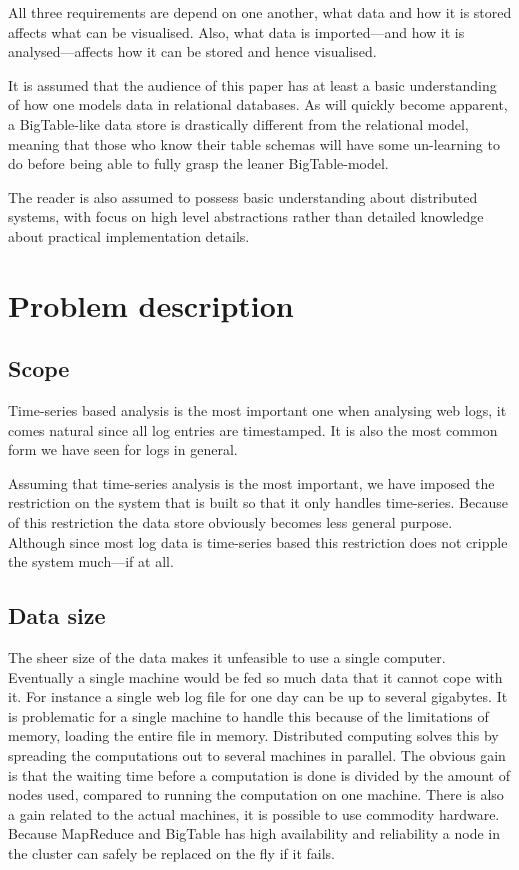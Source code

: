 \documentclass[a4paper,10pt]{book}
\begin{document}
All three requirements are depend on one another, what data and how it is
stored affects what can be visualised. Also, what data is imported---and
how it is analysed---affects how it can be stored and hence visualised.

It is assumed that the audience of this paper has at least a basic
understanding of how one models data in relational databases. As will
quickly become apparent, a BigTable-like \cite{bigtable} data store is
drastically different from the relational model, meaning that those who
know their table schemas will have some un-learning to do before being able
to fully grasp the leaner BigTable-model.

The reader is also assumed to possess basic understanding about distributed
systems, with focus on high level abstractions rather than detailed
knowledge about practical implementation details.



\section{Problem description}

\subsection{Scope}

Time-series based analysis is the most important one when analysing web
logs, it comes natural since all log entries are timestamped.
\cite{discoveringweb} It is also the most common form we have seen for logs
in general.

Assuming that time-series analysis is the most important, we have imposed
the restriction on the system that is built so that it only handles
time-series. Because of this restriction the data store obviously becomes
less general purpose. Although since most log data is time-series based
this restriction does not cripple the system much---if at all.



\subsection{Data size}

The sheer size of the data makes it unfeasible to use a single computer.
Eventually a single machine would be fed so much data that it cannot cope
with it. For instance a single web log file for one day can be up to
several gigabytes. It is problematic for a single machine to handle this
because of the limitations of memory, loading the entire file in memory.
Distributed computing solves this by spreading the computations out to
several machines in parallel. The obvious gain is that the waiting time
before a computation is done is divided by the amount of nodes used,
compared to running the computation on one machine. There is also a gain
related to the actual machines, it is possible to use commodity hardware.
Because MapReduce and BigTable has high availability and reliability a node
in the cluster can safely be replaced on the fly if it fails.
\end{document}
